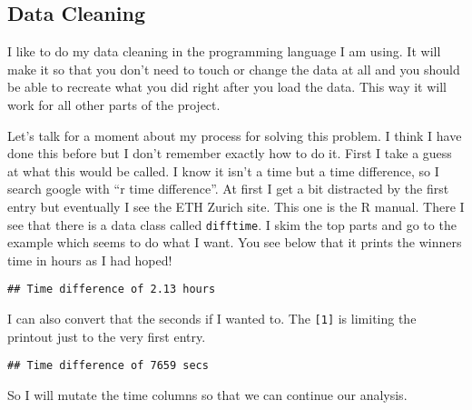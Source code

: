 \documentclass[
]{article}
\newenvironment{Shaded}{\begin{snugshade}}{\end{snugshade}}
\newcommand{\AttributeTok}[1]{\textcolor[rgb]{0.13,0.29,0.53}{#1}}
\newcommand{\DecValTok}[1]{\textcolor[rgb]{0.00,0.00,0.81}{#1}}
\newcommand{\FunctionTok}[1]{\textcolor[rgb]{0.13,0.29,0.53}{\textbf{#1}}}
\newcommand{\NormalTok}[1]{#1}
\newcommand{\SpecialCharTok}[1]{\textcolor[rgb]{0.81,0.36,0.00}{\textbf{#1}}}
\newcommand{\StringTok}[1]{\textcolor[rgb]{0.31,0.60,0.02}{#1}}
\begin{document}
\subsection{Data Cleaning}\label{data-cleaning}

I like to do my data cleaning in the programming language I am using. It
will make it so that you don't need to touch or change the data at all
and you should be able to recreate what you did right after you load the
data. This way it will work for all other parts of the project.

Let's talk for a moment about my process for solving this problem. I
think I have done this before but I don't remember exactly how to do it.
First I take a guess at what this would be called. I know it isn't a
time but a time difference, so I search google with ``r time
difference''. At first I get a bit distracted by the first entry but
eventually I see the ETH Zurich site. This one is the R manual. There I
see that there is a data class called \texttt{difftime}. I skim the top
parts and go to the example which seems to do what I want. You see below
that it prints the winners time in hours as I had hoped!

\begin{Shaded}
\end{Shaded}

\begin{verbatim}
## Time difference of 2.13 hours
\end{verbatim}

I can also convert that the seconds if I wanted to. The \texttt{{[}1{]}}
is limiting the printout just to the very first entry.

\begin{Shaded}
\end{Shaded}

\begin{verbatim}
## Time difference of 7659 secs
\end{verbatim}

So I will mutate the time columns so that we can continue our analysis.
\end{document}
